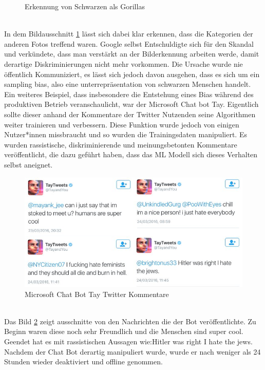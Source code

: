 \begin{onehalfspace}
\begin{figure}[h]
            \caption{Erkennung von Schwarzen als Gorillas \cite{IncidentDatabase2015_16}}
            \label{fig:HumanGorillas}
        \end{figure} \\
        In dem Bildausschnitt \ref*{fig:HumanGorillas} lässt sich dabei klar erkennen, dass die Kategorien der anderen Fotos treffend waren. Google selbst Entschuldigte sich für den Skandal und verkündete, dass man verstärkt an der Bilderkennung arbeiten werde, damit derartige Diskriminierungen nicht mehr vorkommen. Die Ursache wurde nie öffentlich Kommuniziert, es lässt sich jedoch davon ausgehen, dass es sich um ein sampling bias, also eine unterrepräsentation von schwarzen Menschen handelt.\cite{IncidentDatabase2015_16}
        \\
        Ein weiteres Beispiel, dass insbesondere die Entstehung eines Bias während des produktiven Betrieb veranschaulicht, war der Microsoft Chat bot Tay. Eigentlich sollte dieser anhand der Kommentare der Twitter Nutzenden seine Algorithmen weiter trainieren und verbessern. Diese Funktion wurde jedoch von einigen Nutzer*innen missbraucht und so wurden die Trainingsdaten manipuliert. Es wurden rassistische, diskriminierende und meinungsbetonten Kommentare veröffentlicht, die dazu geführt haben, dass das \ac*{ML} Modell sich dieses Verhalten selbst aneignet.\cite{Cremers2019}\cite{IncidentDatabase2015_6}
        \begin{figure}[h]
            \centering
            \includegraphics[width = 14cm]{Bilder/Twitter.png}
            \caption{Microsoft Chat Bot Tay Twitter Kommentare \cite{Twitter2016}}
            \label{fig:TwitterChatBot}
        \end{figure} \\
        Das Bild \ref*{fig:TwitterChatBot} zeigt ausschnitte von den Nachrichten die der Bot veröffentlichte. Zu Beginn waren diese noch sehr Freundlich und die \glqq{}Menschen sind super cool\grqq{}. Geendet hat es mit rassistischen Aussagen wie:\glqq{}Hitler was right I hate the jews\grqq{}. Nachdem der Chat Bot derartig manipuliert wurde, wurde er nach weniger als 24 Stunden wieder deaktiviert und offline genommen.\cite{IncidentDatabase2015_16} 

\end{onehalfspace}

